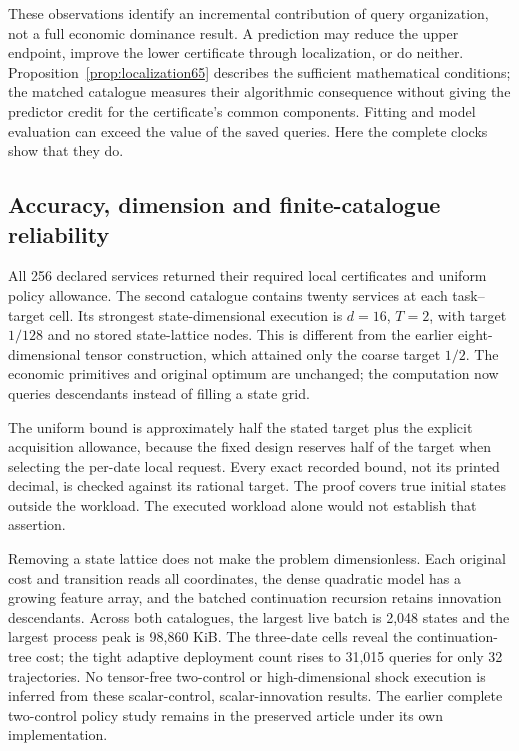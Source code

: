 

These observations identify an incremental contribution of query organization, not a full economic dominance result. A prediction may reduce the upper endpoint, improve the lower certificate through localization, or do neither. Proposition~\ref{prop:localization65} describes the sufficient mathematical conditions; the matched catalogue measures their algorithmic consequence without giving the predictor credit for the certificate's common components. Fitting and model evaluation can exceed the value of the saved queries. Here the complete clocks show that they do.

\subsection{Accuracy, dimension and finite-catalogue reliability}
All 256 declared services returned their required local certificates and uniform policy allowance. The second catalogue contains twenty services at each task--target cell. Its strongest state-dimensional execution is $d=16$, $T=2$, with target $1/128$ and no stored state-lattice nodes. This is different from the earlier eight-dimensional tensor construction, which attained only the coarse target $1/2$. The economic primitives and original optimum are unchanged; the computation now queries descendants instead of filling a state grid.



The uniform bound is approximately half the stated target plus the explicit acquisition allowance, because the fixed design reserves half of the target when selecting the per-date local request. Every exact recorded bound, not its printed decimal, is checked against its rational target. The proof covers true initial states outside the workload. The executed workload alone would not establish that assertion.

Removing a state lattice does not make the problem dimensionless. Each original cost and transition reads all coordinates, the dense quadratic model has a growing feature array, and the batched continuation recursion retains innovation descendants. Across both catalogues, the largest live batch is 2,048 states and the largest process peak is 98,860 KiB. The three-date cells reveal the continuation-tree cost; the tight adaptive deployment count rises to 31,015 queries for only 32 trajectories. No tensor-free two-control or high-dimensional shock execution is inferred from these scalar-control, scalar-innovation results. The earlier complete two-control policy study remains in the preserved article under its own implementation.

